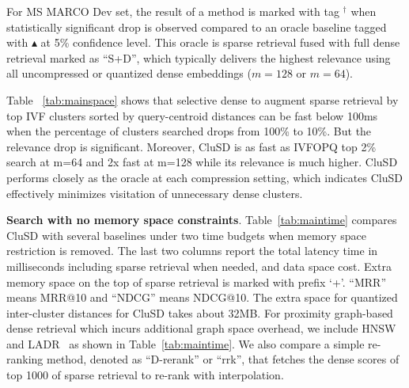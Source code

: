 For MS MARCO Dev set, the result of a method is marked with  tag $^\dag$ when 
statistically significant drop is observed compared to  an oracle baseline
tagged with $\blacktriangle$ at 5\% confidence level.  This oracle
is sparse retrieval fused with full dense retrieval marked as ``S+D'', which typically delivers the highest relevance  
using all uncompressed or quantized dense embeddings ($m=128$ or $m=64$).

Table ~\ref{tab:mainspace} 
shows that
selective dense  to augment sparse retrieval by top IVF clusters sorted by query-centroid distances 
can be fast below  100ms  when the percentage of clusters searched  drops from 100\% to 10\%. But the relevance drop is significant. 
Moreover, CluSD is as  fast  as IVFOPQ  top 2\% search at m=64 and 2x fast at m=128 while
its relevance is much higher.
CluSD  performs  closely as the oracle at each compression setting, which  
indicates CluSD effectively minimizes visitation of unnecessary  dense clusters. 

 

{\bf Search with no memory space constraints}.
Table~\ref{tab:maintime} compares  CluSD with  several baselines under two time budgets when memory space restriction is removed.
The last two columns report the total latency time in milliseconds including sparse retrieval when needed,
and data space cost. Extra memory space on the top of sparse retrieval is marked with prefix `+'. 
``MRR'' means  MRR@10 and ``NDCG'' means  NDCG@10.
The extra space for quantized inter-cluster distances for CluSD takes about 32MB. 
For proximity graph-based dense retrieval which incurs additional graph space overhead,
we include  HNSW~\cite{2020TPAMI-HNSW} and  LADR~\cite{2023SIGIR-LADR} as shown in Table~\ref{tab:maintime}. 
We also compare  a simple re-ranking method,  denoted as ``D-rerank'' or ``rrk'', 
that fetches the dense scores of top 1000 of sparse retrieval to re-rank with interpolation. 




